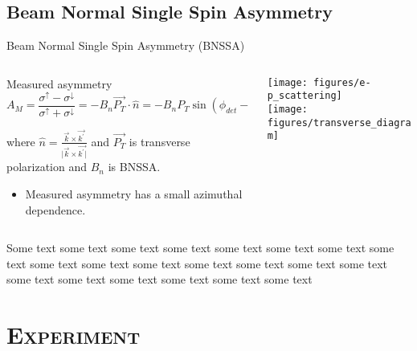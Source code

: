 \documentclass[xcolor=x11names,compress,8pt]{beamer}
\renewcommand{\(}{\begin{columns}}
\renewcommand{\)}{\end{columns}}
\newcommand{\<}[1]{\begin{column}{#1}}
\renewcommand{\>}{\end{column}}
\begin{document}
\subsection{Beam Normal Single Spin Asymmetry}
\begin{frame}{Beam Normal Single Spin Asymmetry (BNSSA)}


  \begin{columns}[T]
    \begin{column}{0.6\textwidth}
     \begin{block}{}
	\pause
	Measured asymmetry
\begin{equation*} \label{equ:eqdTransverse1}
A_{M} = \frac{\sigma^{\uparrow} - \sigma^{\downarrow}}{\sigma^{\uparrow} + \sigma^{\downarrow}} = - B_{n} \vec{P_{T}} \cdot  \hat{n} = - B_{n}P_{T} \sin(\phi_{det} - \phi_{s})
\end{equation*}

where $\hat{n} = \frac{\vec{k}\times\vec{k^{\prime}} }{\vert \vec{k}\times\vec{k^{\prime}\vert}}$ and $\vec{P_{T}}$ is transverse polarization and $B_{n}$ is BNSSA.

\begin{itemize}
\item Measured asymmetry has a small azimuthal dependence.
\end{itemize}

    \end{block}
    \end{column}
    
    
    \begin{column}{0.4\textwidth}
    \begin{block}{}
	\texttt{[image: figures/e-p\_scattering]}
	\pause
	\\
	\texttt{[image: figures/transverse\_diagram]}	
    \end{block}
    \end{column}
  \end{columns}

	\pause
Some text some text some text some text some text some text some text some text some text some text some text some text some text some text some text some text some text some text some text some text some text


\end{frame}


\section{\scshape Experiment}
\end{document}
